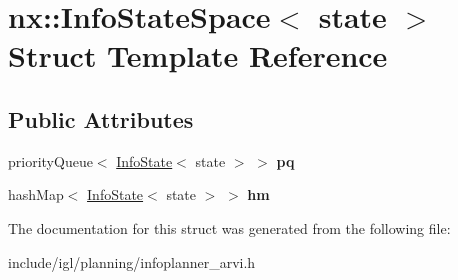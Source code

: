 \hypertarget{structnx_1_1InfoStateSpace}{}\section{nx\+:\+:Info\+State\+Space$<$ state $>$ Struct Template Reference}
\label{structnx_1_1InfoStateSpace}
\subsection*{Public Attributes}
\begin{DoxyCompactItemize}
\item 
\mbox{\label{structnx_1_1InfoStateSpace_a92784e02eccffbc05ecf76bdbe07a643}} 
priority\+Queue$<$ \hyperlink{structnx_1_1InfoState}{Info\+State}$<$ state $>$ $>$ {\bfseries pq}
\item 
\mbox{\label{structnx_1_1InfoStateSpace_a24d71b39a47206a4d6da27154b12c9e0}} 
hash\+Map$<$ \hyperlink{structnx_1_1InfoState}{Info\+State}$<$ state $>$ $>$ {\bfseries hm}
\end{DoxyCompactItemize}


The documentation for this struct was generated from the following file\+:\begin{DoxyCompactItemize}
\item 
include/igl/planning/infoplanner\+\_\+arvi.\+h\end{DoxyCompactItemize}
